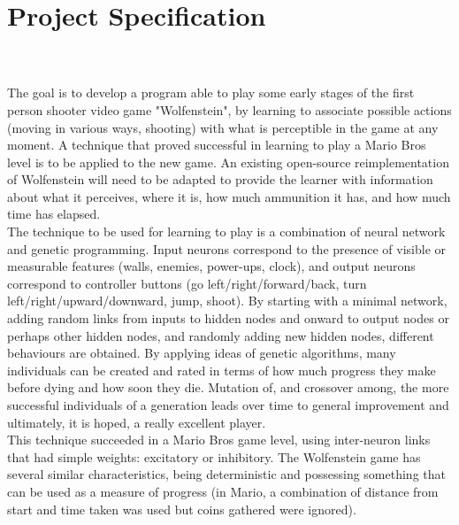 \documentclass[]{Learning-to-Play-Wolfenstein-thesis}
\begin{document}
\maketitle


\chapter*{Project Specification}
\\\\
The goal is to develop a program able to play some early stages of the first person shooter video game "Wolfenstein", by learning to associate possible actions (moving in various ways, shooting) with what is perceptible in the game at any moment. A technique that proved successful in learning to play a Mario Bros level is to be applied to the new game. An existing open-source reimplementation of Wolfenstein will need to be adapted to provide the learner with information about what it perceives, where it is, how much ammunition it has, and how much time has elapsed.\\

The technique to be used for learning to play is a combination of neural network and genetic programming. Input neurons correspond to the presence of visible or measurable features (walls, enemies, power-ups, clock), and output neurons correspond to controller buttons (go left/right/forward/back, turn left/right/upward/downward, jump, shoot). By starting with a minimal network, adding random links from inputs to hidden nodes and onward to output nodes or perhaps other hidden nodes, and randomly adding new hidden nodes, different behaviours are obtained. By applying ideas of genetic algorithms, many individuals can be created and rated in terms of how much progress they make before dying and how soon they die. Mutation of, and crossover among, the more successful individuals of a generation leads over time to general improvement and ultimately, it is hoped, a really excellent player.\\

This technique succeeded in a Mario Bros game level, using inter-neuron links that had simple weights: excitatory or inhibitory. The Wolfenstein game has several similar characteristics, being deterministic and possessing something that can be used as a measure of progress (in Mario, a combination of distance from start and time taken was used but coins gathered were ignored).\\
\end{document}
